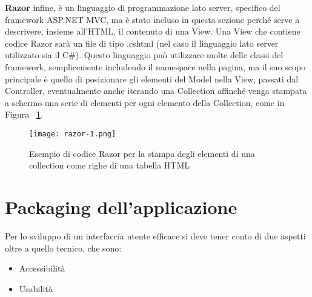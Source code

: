 \textbf{Razor} \cite{razor} infine, è un linguaggio di programmazione lato server, specifico del framework ASP.NET MVC, ma è stato incluso in questa sezione perché serve a descrivere, insieme all'HTML, il contenuto di una View.
Una View che contiene codice Razor sarà un file di tipo .cshtml (nel caso il linguaggio lato server utilizzato sia il C\#).
Questo linguaggio può utilizzare molte delle classi del framework, semplicemente includendo il namespace nella pagina, ma il suo scopo principale è quello di posizionare gli elementi del Model nella View, passati dal Controller, eventualmente anche iterando una Collection affinché venga stampata a schermo una serie di elementi per ogni elemento della Collection, come in Figura ~\ref{fig:Razor}.

\begin{figure}[H]
    \centering
    \texttt{[image: razor-1.png]}
    \caption{Esempio di codice Razor per la stampa degli elementi di una collection come righe di una tabella HTML}
    \label{fig:Razor}
\end{figure}



\newpage

\section{Packaging dell'applicazione}

Per lo sviluppo di un interfaccia utente efficace si deve tener conto di due aspetti oltre a quello tecnico, che sono:
\begin{itemize}
\item Accessibilità
\item Usabilità
\end{itemize}

